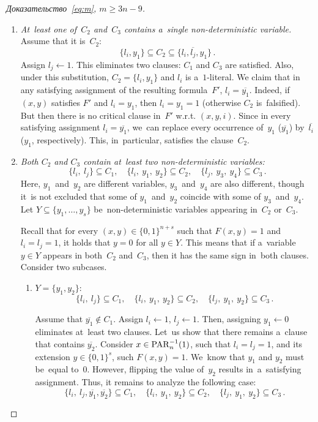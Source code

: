 \begin{proof}[Доказательство~\eqref{eq:m}, $m \ge 3n-9$]
\begin{enumerate}
		\begin{enumerate}
			\item \emph{At~least one of~$C_2$ and~$C_3$ contains a~single non-deterministic variable.} Assume that it is~$C_2$:
			\[\{l_i,y_1\} \subseteq C_2 \subseteq \{l_i, \overline{l_j}, y_1\}\,. \]
			Assign $l_j \gets 1$. This eliminates two clauses: $C_1$ and $C_3$ are satisfied. Also, under this substitution, $C_2=\{l_i,y_1\}$ and $l_i$
			is a~$1$-literal. We claim that in any satisfying assignment of the resulting formula~$F'$, $l_i=\overline{y_1}$. Indeed, if $(x,y)$
			satisfies $F'$ and $l_i=y_1$, then $l_i=y_1=1$ (otherwise $C_2$
			is~falsified). But then there is no critical clause in~$F'$ w.r.t. $(x,y,i)$. Since in every satisfying assignment $l_i=\overline{y_1}$,
			we~can replace every occurrence of~$y_1$ ($\overline{y_1}$)
			by~$\overline{l_i}$ ($y_1$, respectively). This, in~particular, satisfies
			the clause~$C_2$.
			
			\item \emph{Both $C_2$ and $C_3$ contain at~least two non-deterministic variables:}
			\[
			\{l_i,\ l_j\} \subseteq C_1, \quad
			\{l_i,\ y_1,\ y_2\} \subseteq C_2, \quad
			\{l_j,\ y_3,\ y_4\} \subseteq C_3 \, .
			\]
			Here, $y_1$~and~$y_2$ are different variables, $y_3$~and~$y_4$ are also different, though it~is not excluded that some of $y_1$~and~$y_2$
			coincide with some of $y_3$~and~$y_4$. Let $Y \subseteq \{y_1, \dotsc, y_s\}$ be~non-deterministic variables appearing in~$C_2$ or~$C_3$.
			
			Recall that for every $(x,y) \in \{0,1\}^{n+s}$ such that $F(x,y)=1$ and $l_i=l_j = 1$, it holds that $y=0$ for all $y \in Y$. This means that
			if a~variable $y \in Y$ appears in both~$C_2$ and~$C_3$, then it has the same sign in~both clauses. Consider two subcases.
			
			\begin{enumerate}
				\item $Y=\{y_1,y_2\}$: \[\{l_i,\ l_j\} \subseteq C_1,\quad  \{l_i,\ y_1,\ y_2\} \subseteq C_2,\quad  \{l_j,\ y_1,\ y_2\} \subseteq C_3 \, .\]
				
				Assume that $\overline{y_1} \not \in C_1$. Assign $l_i \gets 1$, $l_j \gets 1$. Then, assigning $y_1 \gets 0$ eliminates at~least two clauses. Let~us show that there remains
				a~clause that contains $\overline{y_2}$. Consider $x \in \operatorname{PAR}_n^{-1} (1)$, such that $l_i = l_j = 1$, and its extension $y \in \{0, 1\}^s$, such $F(x, y) = 1$. We~know that $y_1$ and $y_2$ must
				be~equal to~$0$. However, flipping the value of~$y_2$ results
				in~a~satisfying assignment.
				Thus, it remains to analyze the following case: \[\{l_i,\ l_j, \overline{y_1}, \overline{y_2} \} \subseteq C_1, \quad               \{l_i,\ y_1,\ y_2\} \subseteq C_2, \quad
				\{l_j,\ y_1,\ y_2\} \subseteq C_3 \, .\]
				

\end{enumerate}
\end{enumerate}
\end{enumerate}
\end{proof}
